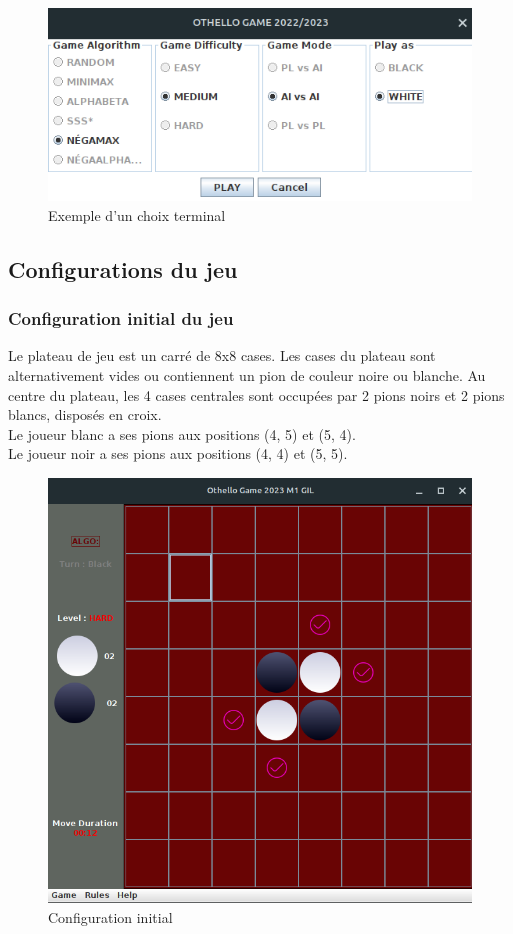 \documentclass[12pt]{article}
\begin{document}
		\begin{figure}[H]
		\centering
		\includegraphics[scale=0.7]{img/choix.png}
		\caption{Exemple d'un choix terminal }
		\label{choix}
	\end{figure}

\subsection{Configurations du jeu}

\subsubsection{Configuration initial du jeu }
 Le plateau de jeu est un carré de 8x8 cases.
Les cases du plateau sont alternativement vides ou contiennent un pion de couleur noire ou blanche.
Au centre du plateau, les 4 cases centrales sont occupées par 2 pions noirs et 2 pions blancs, disposés en croix.\\
    Le joueur blanc a ses pions aux positions (4, 5) et (5, 4).\\
Le joueur noir a ses pions aux positions (4, 4) et (5, 5).
		\begin{figure}[H]
		\centering
		\includegraphics[scale=0.5]{img/conf_init.png}
		\caption{Configuration initial }
		\label{Conf_initial}
	\end{figure}
\end{document}
